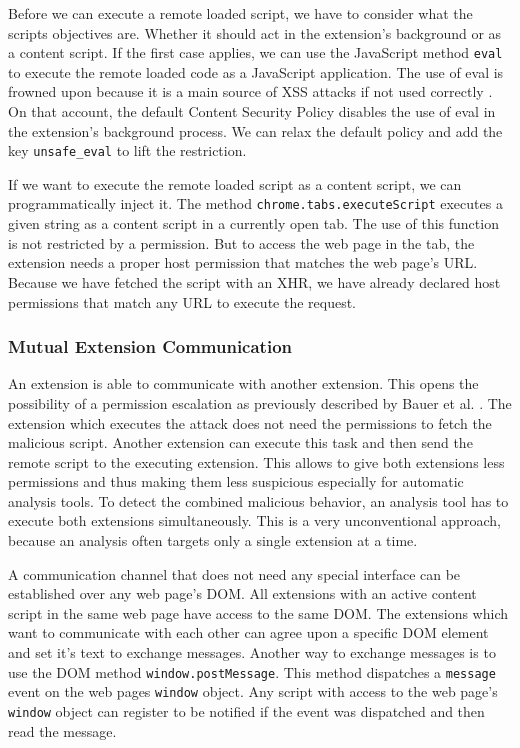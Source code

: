 	Before we can execute a remote loaded script, we have to consider what the scripts objectives are. Whether it should act in the extension's background or as a content script. If the first case applies, we can use the JavaScript method \texttt{eval} to execute the remote loaded code as a JavaScript application. The use of eval is frowned upon because it is a main source of XSS attacks if not used correctly \cite{mozillaDangerousEval}. On that account, the default Content Security Policy disables the use of eval in the extension's background process. We can relax the default policy and add the key \texttt{unsafe\_eval} to lift the restriction.
	
	If we want to execute the remote loaded script as a content script, we can programmatically inject it. The method \texttt{chrome.tabs.executeScript} executes a given string as a content script in a currently open tab. The use of this function is not restricted by a permission. But to access the web page in the tab, the extension needs a proper host permission that matches the web page's URL. Because we have fetched the script with an XHR, we have already declared host permissions that match any URL to execute the request.
	
\subsubsection{Mutual Extension Communication}
\label{sec:mutalExtensionCommunication}

	An extension is able to communicate with another extension. This opens the possibility of a permission escalation as previously described by Bauer et al. \cite{extensions:cns14}. The extension which executes the attack does not need the permissions to fetch the malicious script. Another extension can execute this task and then send the remote script to the executing extension. This allows to give both extensions less permissions and thus making them less suspicious especially for automatic analysis tools. To detect the combined malicious behavior, an analysis tool has to execute both extensions simultaneously. This is a very unconventional approach, because an analysis often targets only a single extension at a time. 
	
	A communication channel that does not need any special interface can be established over any web page's DOM. All extensions with an active content script in the same web page have access to the same DOM. The extensions which want to communicate with each other can agree upon a specific DOM element and set it's text to exchange messages. Another way to exchange messages is to use the DOM method \texttt{window.postMessage}. This method dispatches a \texttt{message} event on the web pages \texttt{window} object. Any script with access to the web page's \texttt{window} object can register to be notified if the event was dispatched and then read the message. 
	
